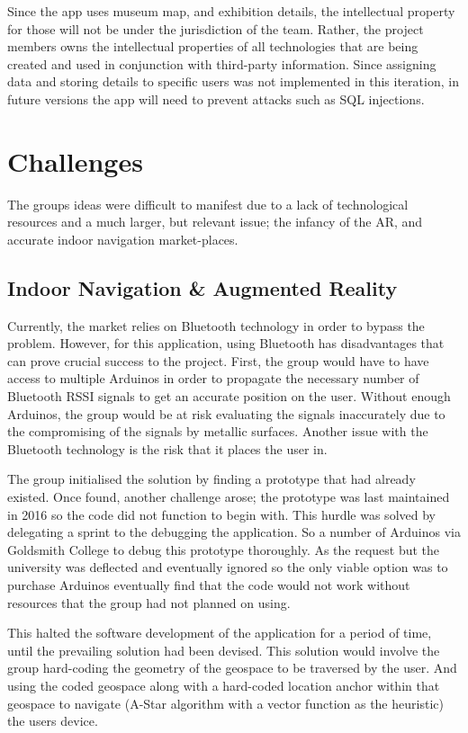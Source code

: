 Since the app uses museum map, and exhibition details, the intellectual property for those will not be under the jurisdiction of the team. Rather, the project members owns the intellectual properties of all technologies that are being created and used in conjunction with third-party information. Since assigning data and storing details to specific users was not implemented in this iteration, in future versions the app will need to prevent attacks such as SQL injections.

\section{Challenges}
The groups ideas were difficult to manifest due to a lack of technological resources and a much larger, but relevant issue; the infancy of the AR, and accurate indoor navigation market-places.

\subsection{Indoor Navigation \& Augmented Reality}
Currently, the market relies on Bluetooth technology in order to bypass the problem. However, for this application, using Bluetooth has disadvantages that can prove crucial success to the project. First, the group would have to have access to multiple Arduinos in order to propagate the necessary number of Bluetooth RSSI signals to get an accurate position on the user. Without enough Arduinos, the group would be at risk evaluating the signals inaccurately due to the compromising of the signals by metallic surfaces. Another issue with the Bluetooth technology is the risk that it places the user in. 

The group initialised the solution by finding a prototype that had already existed.  Once found, another challenge arose; the prototype was last maintained in 2016 so the code did not function to begin with. This hurdle was solved by delegating a sprint to the debugging the application. So a number of Arduinos via Goldsmith College to debug this prototype thoroughly. As the request but the university was deflected and eventually ignored so the only viable option was to purchase Arduinos eventually find that the code would not work without resources that the group had not planned on using. 

This halted the software development of the application for a period of time, until the prevailing solution had been devised. This solution would involve the group hard-coding the geometry of the geospace to be traversed by the user. And using the coded geospace along with a hard-coded location anchor within that geospace to navigate (A-Star algorithm with a vector function as the heuristic) the users device.

